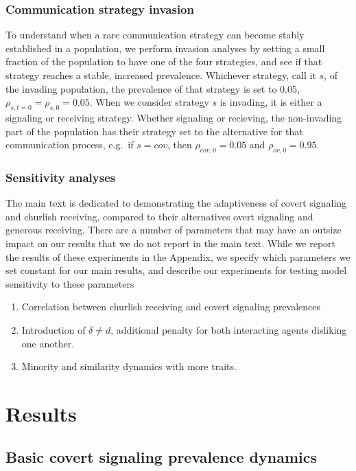 \documentclass[11pt,letterpaper]{article}
\begin{document}
\subsubsection{Communication strategy invasion}

To understand when a rare communication strategy can become stably established
in a population, we perform invasion analyses by setting a small fraction of
the population to have one of the four strategies, and see if that strategy
reaches a stable, increased prevalence. Whichever strategy, call it $s$,  of the invading
population, the prevalence of that strategy is set to 0.05, $\rho_{s,t=0}=\rho_{s,0}=0.05$.
When we consider strategy $s$ is invading, it is either a signaling or receiving strategy. 
Whether signaling or recieving, the non-invading part of the population has
their strategy set to the alternative for that communication process, e.g.\
if $s=cov$, then $\rho_{cov,0}=0.05$ and $\rho_{ov,0}=0.95$.

\subsubsection{Sensitivity analyses}

The main text is dedicated to demonstrating the adaptiveness of covert signaling
and churlish receiving, compared to their alternatives overt signaling and
generous receiving. There are a number of parameters that may have an outsize impact on our results
that we do not report in the main text. While we report the results of these
experiments in the Appendix, we specify which parameters we set constant for
our main results, and describe our experiments for testing model sensitivity
to these parameters

\begin{enumerate}
  \item Correlation between churlish receiving and covert signaling prevalences
  \item Introduction of $\delta \neq d$, additional penalty for both interacting
    agents disliking one another.
  \item Minority and similarity dynamics with more traits.
\end{enumerate}



\section{Results}

\subsection{Basic covert signaling prevalence dynamics}
\end{document}
